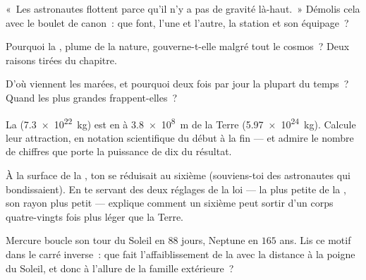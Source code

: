 \begin{exercise}[$\star$]\label{exo:g9:gravitation:6}
«~Les astronautes flottent parce qu'il n'y a pas de gravité là-haut.~»
Démolis cela avec le boulet de canon~: que font, l'une et l'autre, la
station et son équipage~?
\end{exercise}

\begin{exercise}[$\star$]\label{exo:g9:gravitation:7}
Pourquoi la ,  plume de la nature, gouverne-t-elle
malgré tout le cosmos~? Deux raisons tirées du chapitre.
\end{exercise}

\begin{exercise}[$\star$]\label{exo:g9:gravitation:8}
D'où viennent les marées, et pourquoi deux fois par jour la plupart du
temps~? Quand les plus grandes frappent-elles~?
\end{exercise}

\begin{exercise}[$\star\star$]\label{exo:g9:gravitation:9}
La  (\qty{7.3e22}{kg}) est en  à \qty{3.8e8}{m} de la Terre
(\qty{5.97e24}{kg}). Calcule leur attraction, en notation
scientifique du début à la fin --- et admire le nombre de chiffres que
porte la puissance de dix du résultat.
\end{exercise}

\begin{exercise}[$\star\star$]\label{exo:g9:gravitation:10}
À la surface de la , ton  se réduisait au sixième
(souviens-toi des astronautes qui bondissaient). En te servant des
deux réglages de la loi --- la  plus petite de la , son rayon
plus petit --- explique comment un sixième peut sortir d'un corps
quatre-vingts fois plus léger que la Terre.
\end{exercise}

\begin{exercise}[$\star\star$]\label{exo:g9:gravitation:11}
Mercure boucle son tour du Soleil en $88$ jours, Neptune en $165$ ans.
Lis ce motif dans le carré inverse~: que fait l'affaiblissement de la
 avec la distance à la poigne du Soleil, et donc à l'allure
de la famille extérieure~?
\end{exercise}

